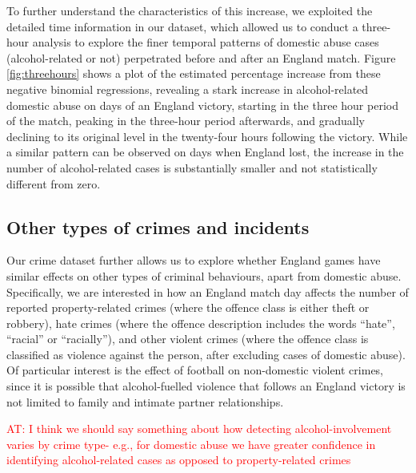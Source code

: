 \documentclass[12pt, a4paper]{article}
\newcommand{\AT}[1]{\textcolor{red}{AT: #1}}
\begin{document}
 To further understand the characteristics of this increase, we exploited the detailed time information in our dataset, which allowed us to conduct a three-hour analysis to explore the finer temporal patterns of domestic abuse cases (alcohol-related or not) perpetrated before and after an England match. Figure \ref{fig:threehours} shows a plot of the estimated percentage increase from these negative binomial regressions, revealing a stark increase in alcohol-related domestic abuse on days of an England victory, starting in the three hour period of the match, peaking in the three-hour period afterwards, and gradually declining to its original level in the twenty-four hours following the victory. While a similar pattern can be observed on days when England lost, the increase in the number of alcohol-related cases is substantially smaller and not statistically different from zero.

\subsection{Other types of crimes and incidents}

Our crime dataset further allows us to explore whether England games have similar effects on other types of criminal behaviours, apart from domestic abuse. Specifically, we are interested in how an England match day affects the number of reported property-related crimes (where the offence class is either theft or robbery), hate crimes (where the offence description includes the words ``hate'', ``racial'' or ``racially''), and other violent crimes (where the offence class is classified as violence against the person, after excluding cases of domestic abuse). Of particular interest is the effect of football on non-domestic violent crimes, since it is possible that alcohol-fuelled violence that follows an England victory is not limited to family and intimate partner relationships. 

\AT{I think we should say something about how detecting alcohol-involvement varies by crime type- e.g., for domestic abuse we have greater confidence in identifying alcohol-related cases as opposed to property-related crimes}
\end{document}
